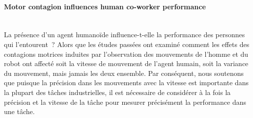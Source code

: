 

\paragraph*{\LARGE {Motor contagion influences human co-worker performance  \\}\\}

La présence d'un agent humanoïde influence-t-elle la performance des personnes qui l'entourent~? Alors que les études passées ont examiné comment les effets des contagions motrices induites par l'observation des mouvements de l'homme et du robot ont affecté soit la vitesse de mouvement de l'agent humain, soit la variance du mouvement, mais jamais les deux ensemble. Par conséquent, nous soutenons que puisque la précision dans les mouvements avec la vitesse est importante dans la plupart des tâches industrielles, il est nécessaire de considérer à la fois la précision et la vitesse de la tâche pour mesurer précisément la performance dans une tâche.





